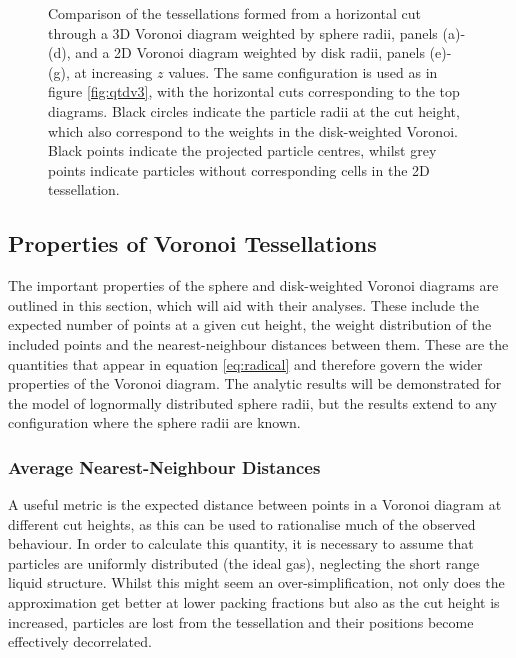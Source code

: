 \begin{figure}[tb]
\begin{subfigure}[b]{0.23\textwidth}
     \end{subfigure}
     
\caption{Comparison of the tessellations formed from a horizontal cut through a 3D Voronoi diagram weighted by sphere radii, panels (a)-(d), and a 2D Voronoi diagram weighted by disk radii, panels (e)-(g), at increasing $z$ values.
	The same configuration is used as in figure \ref{fig:qtdv3}, with the horizontal cuts corresponding to the top diagrams.
	Black circles indicate the particle radii at the cut height, which also correspond to the weights in the disk\--weighted Voronoi. Black points indicate the projected particle centres, whilst grey points indicate particles without corresponding cells in the 2D tessellation.}
	\label{fig:vorcuts}
\end{figure}

\subsection{Properties of Voronoi Tessellations}

The important properties of the sphere and disk\--weighted Voronoi diagrams are outlined in this section, which will aid with their analyses.
These include the expected number of points at a given cut height, the weight distribution of the included points and the nearest\--neighbour distances between them.
These are the quantities that appear in equation \eqref{eq:radical} and therefore govern the wider properties of the Voronoi diagram. 
The analytic results will be demonstrated for the model of lognormally distributed sphere radii, but the results extend to any configuration where the sphere radii are known.

\subsubsection{Average Nearest\--Neighbour Distances}

A useful metric is the expected distance between points in a Voronoi diagram at different cut heights, as this can be used to rationalise much of the observed behaviour.
In order to calculate this quantity, it is necessary to assume that particles are uniformly distributed (the ideal gas), neglecting the short range liquid structure.
Whilst this might seem an over\--simplification, not only does the approximation get better at lower packing fractions but also as the cut height is increased, particles are lost from the tessellation and their positions become effectively decorrelated. 


